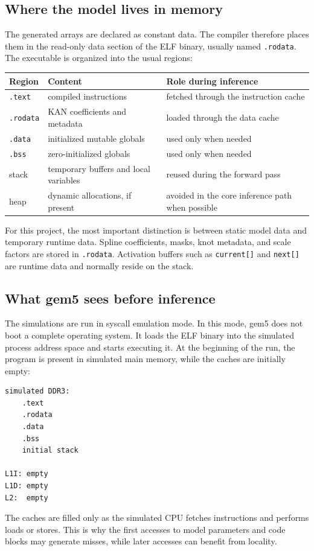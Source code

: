 \documentclass[11pt,a4paper]{article}
\begin{document}
\subsection{Where the model lives in memory}

The generated arrays are declared as constant data.
The compiler therefore places them in the read-only data section of the ELF binary, usually named \texttt{.rodata}.
The executable is organized into the usual regions:
\begin{center}
\begin{tabular}{lll}
\toprule
Region & Content & Role during inference \\
\midrule
\texttt{.text} & compiled instructions & fetched through the instruction cache \\
\texttt{.rodata} & KAN coefficients and metadata & loaded through the data cache \\
\texttt{.data} & initialized mutable globals & used only when needed \\
\texttt{.bss} & zero-initialized globals & used only when needed \\
stack & temporary buffers and local variables & reused during the forward pass \\
heap & dynamic allocations, if present & avoided in the core inference path when possible \\
\bottomrule
\end{tabular}
\end{center}

For this project, the most important distinction is between static model data and temporary runtime data.
Spline coefficients, masks, knot metadata, and scale factors are stored in \texttt{.rodata}.
Activation buffers such as \texttt{current[]} and \texttt{next[]} are runtime data and normally reside on the stack.

\subsection{What gem5 sees before inference}

The simulations are run in syscall emulation mode.
In this mode, gem5 does not boot a complete operating system.
It loads the ELF binary into the simulated process address space and starts executing it.
At the beginning of the run, the program is present in simulated main memory, while the caches are initially empty:
\begin{verbatim}
simulated DDR3:
    .text
    .rodata
    .data
    .bss
    initial stack

L1I: empty
L1D: empty
L2:  empty
\end{verbatim}
The caches are filled only as the simulated CPU fetches instructions and performs loads or stores.
This is why the first accesses to model parameters and code blocks may generate misses, while later accesses can benefit from locality.
\end{document}
